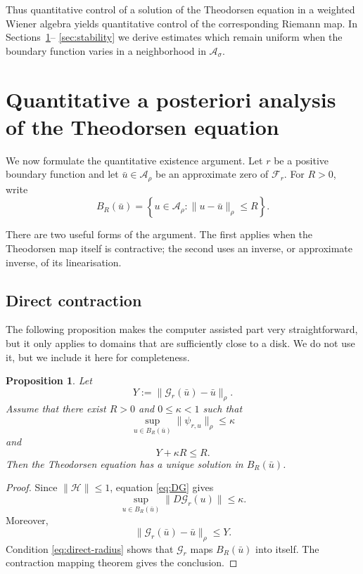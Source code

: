 \documentclass[11pt,a4paper]{amsart}
\newtheorem{proposition}[theorem]{Proposition}
\begin{document}
Thus quantitative control of a solution of the Theodorsen equation
in a weighted Wiener algebra yields quantitative control of the
corresponding Riemann map. In Sections~\ref{sec:aposteriori}--
\ref{sec:stability} we derive estimates which remain uniform when the
boundary function varies in a neighborhood in $\mathcal A_\sigma$.


\section{Quantitative a posteriori analysis of the Theodorsen equation}
\label{sec:aposteriori}

We now formulate the quantitative existence argument. Let $r$ be a positive boundary
function and let $\bar u\in\mathcal A_\rho$ be an approximate zero of
$\mathcal F_r$. For $R>0$, write
\[
B_R(\bar u)
=
\left\{
u\in\mathcal A_\rho:
\|u-\bar u\|_\rho\le R
\right\}.
\]

There are two useful forms of the argument. The first applies when the
Theodorsen map itself is contractive; the second uses an inverse, or
approximate inverse, of its linearisation.


\subsection{Direct contraction}
The following proposition makes the computer assisted part very straightforward, but it only applies to domains that are sufficiently close to a disk. We do not use it, but we include it here for completeness.
\begin{proposition}\label{prop:direct-contraction}
	Let
	\[
	Y
	:=
	\|\mathcal G_r(\bar u)-\bar u\|_\rho.
	\]
	Assume that there exist $R>0$ and $0\le\kappa<1$ such that
	\begin{equation}\label{eq:direct-derivative}
		\sup_{u\in B_R(\bar u)}
		\|\psi_{r,u}\|_\rho
		\le\kappa
	\end{equation}
	and
	\begin{equation}\label{eq:direct-radius}
		Y+\kappa R\le R.
	\end{equation}
	Then the Theodorsen equation has a unique solution in
	$B_R(\bar u)$.
\end{proposition}

\begin{proof}
	Since $\|\mathcal H\|\le1$, equation \eqref{eq:DG} gives
	\[
	\sup_{u\in B_R(\bar u)}
	\|D\mathcal G_r(u)\|
	\le\kappa.
	\]
	Moreover,
	\[
	\|\mathcal G_r(\bar u)-\bar u\|_\rho
	\le Y.
	\]
	Condition \eqref{eq:direct-radius} shows that
	$\mathcal G_r$ maps $B_R(\bar u)$ into itself. The contraction mapping
	theorem gives the conclusion.
\end{proof}
\end{document}
